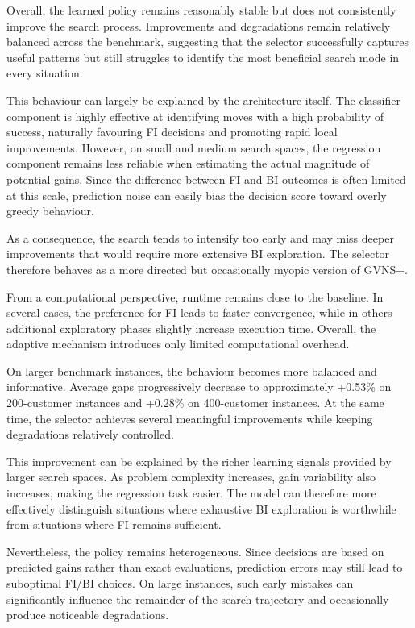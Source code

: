 Overall, the learned policy remains reasonably stable but does not consistently improve the search process. Improvements and degradations remain relatively balanced across the benchmark, suggesting that the selector successfully captures useful patterns but still struggles to identify the most beneficial search mode in every situation.

This behaviour can largely be explained by the architecture itself. The classifier component is highly effective at identifying moves with a high probability of success, naturally favouring FI decisions and promoting rapid local improvements. However, on small and medium search spaces, the regression component remains less reliable when estimating the actual magnitude of potential gains. Since the difference between FI and BI outcomes is often limited at this scale, prediction noise can easily bias the decision score toward overly greedy behaviour.

As a consequence, the search tends to intensify too early and may miss deeper improvements that would require more extensive BI exploration. The selector therefore behaves as a more directed but occasionally myopic version of GVNS+.

From a computational perspective, runtime remains close to the baseline. In several cases, the preference for FI leads to faster convergence, while in others additional exploratory phases slightly increase execution time. Overall, the adaptive mechanism introduces only limited computational overhead.

On larger benchmark instances, the behaviour becomes more balanced and informative. Average gaps progressively decrease to approximately +0.53\% on 200-customer instances and +0.28\% on 400-customer instances. At the same time, the selector achieves several meaningful improvements while keeping degradations relatively controlled.

This improvement can be explained by the richer learning signals provided by larger search spaces. As problem complexity increases, gain variability also increases, making the regression task easier. The model can therefore more effectively distinguish situations where exhaustive BI exploration is worthwhile from situations where FI remains sufficient.

Nevertheless, the policy remains heterogeneous. Since decisions are based on predicted gains rather than exact evaluations, prediction errors may still lead to suboptimal FI/BI choices. On large instances, such early mistakes can significantly influence the remainder of the search trajectory and occasionally produce noticeable degradations. 

